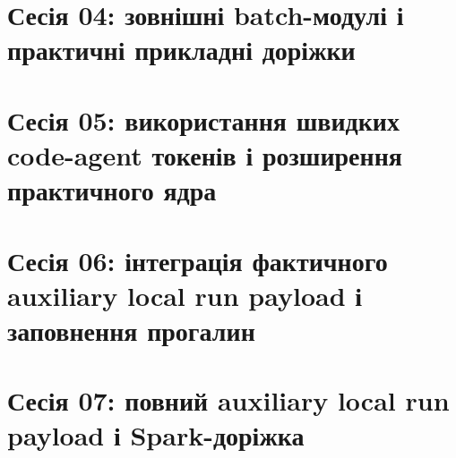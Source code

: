 \documentclass[11pt,a4paper,oneside]{book}
\begin{document}
\part{Сесія 04: зовнішні batch-модулі і практичні прикладні доріжки}








\part{Сесія 05: використання швидких code-agent токенів і розширення практичного ядра}








\part{Сесія 06: інтеграція фактичного auxiliary local run payload і заповнення прогалин}










\part{Сесія 07: повний auxiliary local run payload і Spark-доріжка}









\appendix





\end{document}
